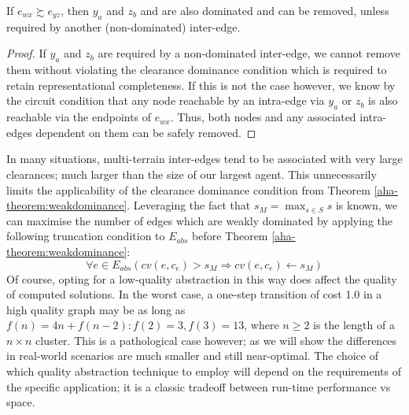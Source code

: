 \begin{corollary}
If $e_{wx} \succsim e_{yz}$, then $y_{a}$ and $z_{b}$ and are also dominated and can be removed, unless required by another (non-dominated) inter-edge. 
\end{corollary}
\begin{proof}
If $y_{a}$ and $z_{b}$ are required by a non-dominated inter-edge, we cannot remove them without violating the clearance dominance condition which is required to retain representational completeness. 
If this is not the case however, we know by the circuit condition that any node reachable by an intra-edge via $y_{a}$ or $z_{b}$ is also reachable via the endpoints of $e_{wx}$. 
Thus, both nodes and any associated intra-edges dependent on them can be safely removed.
\end{proof}
In many situations, multi-terrain inter-edges tend to be associated with very large clearances; much larger than the size of our largest agent.
This unnecessarily limits the applicability of the clearance dominance condition from Theorem \ref{aha-theorem:weakdominance}. 
Leveraging the fact that $s_M = \max_{s \in S} s$ is known, we can maximise the number of edges which are weakly dominated by applying the following truncation condition to $E_{abs}$ before Theorem \ref{aha-theorem:weakdominance}:
$$
\forall e \in E_{abs} (cv(e, c_{e}) > s_M \Rightarrow cv(e, c_{e}) \leftarrow s_M) 
$$
Of course, opting for a low-quality abstraction in this way does affect the quality of computed solutions. 
In the worst case, a one-step transition of cost 1.0 in a high quality graph may be as long as $f(n) = 4n + f(n-2) : f(2) = 3, f(3) = 13$, where $n \geq 2$ is the length of a $n \times n$ cluster.
This is a pathological case however; as we will show the differences in real-world scenarios are much smaller and still near-optimal. 
The choice of which quality abstraction technique to employ will depend on the requirements of the specific application; it is a classic tradeoff between run-time performance vs space.
